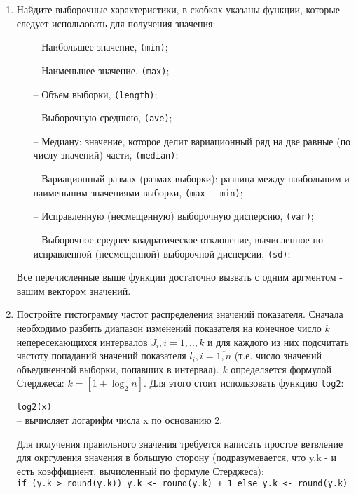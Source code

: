 \begin{enumerate}
	\item Найдите выборочные характеристики, в скобках указаны функции, которые следует использовать для получения значения:
		\begin{itemize}
			\item[--] Наибольшее значение, \texttt{(min)};
			\item[--] Наименьшее значение, \texttt{(max)};
			\item[--] Объем выборки, \texttt{(length)};
			\item[--] Выборочную среднюю, \texttt{(ave)};
			\item[--] Медиану: значение, которое делит вариационный ряд на две равные (по числу значений) части, \texttt{(median)};
			\item[--] Вариационный размах (размах выборки): разница между наибольшим и наименьшим значениями выборки, \texttt{(max - min)}; 
			\item[--] Исправленную (несмещенную) выборочную дисперсию, \texttt{(var)};
			\item[--] Выборочное среднее квадратическое отклонение, вычисленное по исправленной (несмещенной) выборочной дисперсии, \texttt{(sd)};
		\end{itemize}
		Все перечисленные выше функции достаточно вызвать с одним аргментом - вашим вектором значений.

	\item Постройте гистограмму частот распределения значений показателя.
		Сначала необходимо разбить диапазон изменений показателя на конечное число $k$
		непересекающихся интервалов $J_{i}, i=1,..,k$  и для каждого из них 
		подсчитать частоту попаданий значений показателя $l_{i}, i=\overline{1,n}$
		(т.е. число значений объединенной выборки, попавших в интервал).
		$k$ определяется формулой Стерджеса: $k=[1+\log_2 n]$.
		Для этого стоит использовать функцию \texttt{log2}:
		\begin{mdframed}[style=BadassFrame]
			\texttt{log2(x)}\\
			-- вычисляет логарифм числа x по основанию 2.
		\end{mdframed}
		Для получения правильного значения требуется написать простое ветвление для окргуления значения в большую сторону
		(подразумевается, что y.k - и есть коэффициент, вычисленный по формуле Стерджеса):\\
		\texttt{if (y.k > round(y.k)) y.k <- round(y.k) + 1 else y.k <- round(y.k)}\\
		

\end{enumerate}
